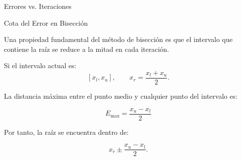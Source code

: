 \documentclass[../../main.tex]{subfiles}
\begin{document}

\begin{frame}{Errores vs. Iteraciones}

\centering


\end{frame}



\begin{frame}{Cota del Error en Bisección}

Una propiedad fundamental del método de bisección es que el intervalo que contiene la raíz se reduce a la mitad en cada iteración.

Si el intervalo actual es:
\[
[x_l,x_u],
\qquad
x_r=
\frac{x_l+x_u}{2}.
\]

La distancia máxima entre el punto medio y cualquier punto del intervalo es:

\[
\boxed{
E_{\max}
=
\frac{x_u-x_l}{2}
}
\]

Por tanto, la raíz se encuentra dentro de:

\[
x_r
\pm
\frac{x_u-x_l}{2}.
\]

\end{frame}


\end{document}
